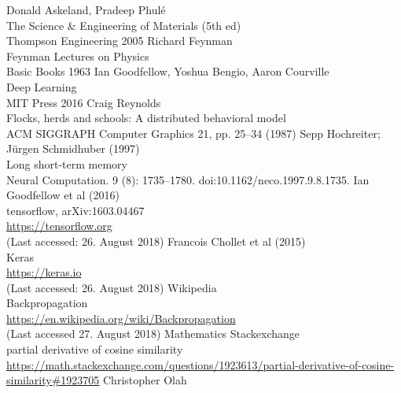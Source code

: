 \documentclass[10pt, a4paper]{UUThesisTemplate}
\begin{document}
\label{fig:tSNE}

    \nocite{*} %
    
    \begin{thebibliography}{--}
     Donald Askeland, Pradeep Phulé\\
    The Science & Engineering of Materials (5th ed)\\
    Thompson Engineering 2005
     Richard Feynman\\
    Feynman Lectures on Physics\\
    Basic Books 1963
     Ian Goodfellow, Yoshua Bengio, Aaron Courville\\
    Deep Learning\\
     MIT Press 2016
      Craig Reynolds\\
     Flocks, herds and schools: A distributed behavioral model\\
     ACM SIGGRAPH Computer Graphics 21, pp. 25–34 (1987)
     Sepp Hochreiter; Jürgen Schmidhuber (1997)\\
    Long short-term memory\\
     Neural Computation. 9 (8): 1735–1780. doi:10.1162/neco.1997.9.8.1735.
      Ian Goodfellow et al (2016)\\
     tensorflow, arXiv:1603.04467\\
     \url{https://tensorflow.org}\\
     (Last accessed: 26. August 2018)
      Francois Chollet et al (2015)\\
     Keras\\
     \url{https://keras.io}\\
     (Last accessed: 26. August 2018)
      Wikipedia\\
     Backpropagation\\
     \url{https://en.wikipedia.org/wiki/Backpropagation}\\
     (Last accessed 27. August 2018)
      Mathematics Stackexchange\\
     partial derivative of cosine similarity\\
     \url{https://math.stackexchange.com/questions/1923613/partial-derivative-of-cosine-similarity#1923705}
     Christopher Olah\\

\end{thebibliography}
\end{document}
